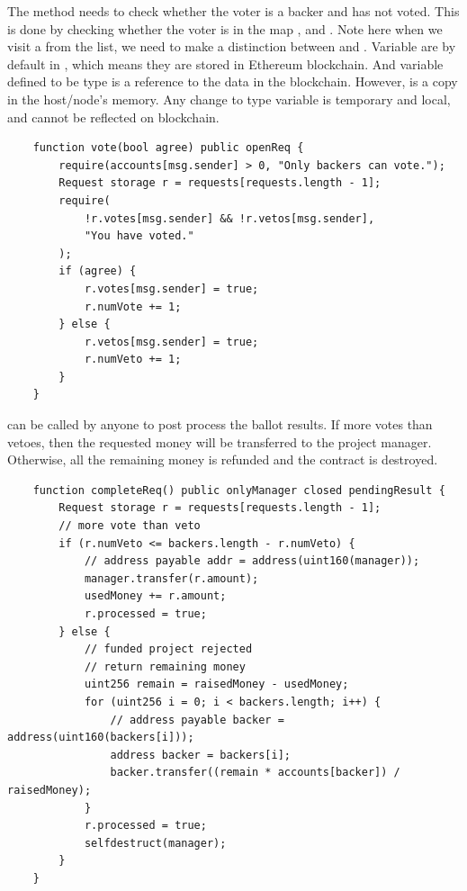 \documentclass{article}
\begin{document}
The  method needs to check whether the voter is a backer and has not voted. This is done by checking whether the voter is in the map ,  and . Note here when we visit a  from the list, we need to make a distinction between  and . Variable are by default in , which means they are stored in Ethereum blockchain. And variable defined to be type  is a reference to the data in the blockchain. However,  is a copy in the host/node's memory. Any change to  type variable is temporary and local, and cannot be reflected on blockchain.

\begin{lstlisting}
    function vote(bool agree) public openReq {
        require(accounts[msg.sender] > 0, "Only backers can vote.");
        Request storage r = requests[requests.length - 1];
        require(
            !r.votes[msg.sender] && !r.vetos[msg.sender],
            "You have voted."
        );
        if (agree) {
            r.votes[msg.sender] = true;
            r.numVote += 1;
        } else {
            r.vetos[msg.sender] = true;
            r.numVeto += 1;
        }
    }
\end{lstlisting}

 can be called by anyone to post  process the ballot results. If more votes than vetoes, then the requested money will be transferred to the project manager. Otherwise, all the remaining money is refunded and the contract is destroyed.
\begin{lstlisting}
    function completeReq() public onlyManager closed pendingResult {
        Request storage r = requests[requests.length - 1];
        // more vote than veto
        if (r.numVeto <= backers.length - r.numVeto) {
            // address payable addr = address(uint160(manager));
            manager.transfer(r.amount);
            usedMoney += r.amount;
            r.processed = true;
        } else {
            // funded project rejected
            // return remaining money
            uint256 remain = raisedMoney - usedMoney;
            for (uint256 i = 0; i < backers.length; i++) {
                // address payable backer = address(uint160(backers[i]));
                address backer = backers[i];
                backer.transfer((remain * accounts[backer]) / raisedMoney);
            }
            r.processed = true;
            selfdestruct(manager);
        }
    }
\end{lstlisting}
\end{document}
